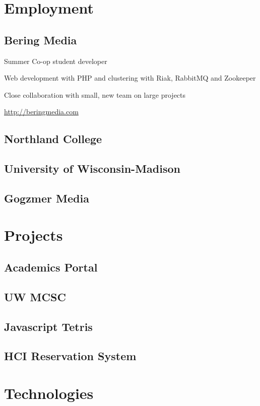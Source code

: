 \documentclass[letterpaper,11pt,notitlepage]{article}
\begin{document}

\section{Employment} 
\subsection{Bering Media}
\begin{employment}
\item Summer Co-op student developer
\item Web development with PHP and clustering with Riak, RabbitMQ and
Zookeeper
\item Close collaboration with small, new team on large  projects
\item \url{http://beringmedia.com}
\end{employment}

\subsection{Northland College}
\subsection{University of Wisconsin-Madison}
\subsection{Gogzmer Media}

\section{Projects}
\subsection{Academics Portal}
\subsection{UW MCSC}
\subsection{Javascript Tetris}
\subsection{HCI Reservation System}

\section{Technologies}
\end{document}
